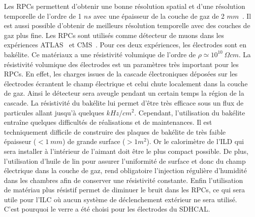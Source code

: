 Les RPCs permettent d'obtenir une bonne résolution spatial et d'une résolution temporelle de l'ordre de 1 $ns$ avec une épaisseur de la couche de gaz de 2 $mm$~\cite{riegler}. Il est aussi possible d'obtenir de meilleurs résolution temporelle avec des couches de gaz plus fine. Les RPCs sont utilisés comme détecteur de muons dans les expériences ATLAS~\cite{atlas} et CMS~\cite{cms}. Pour ces deux expériences, les électrodes sont en bakélite. Ce matériaux a une résistivité volumique de l'ordre de $\rho\simeq10^{10}~\Omega cm$. La résistivité volumique des électrodes est un paramètres très important pour les RPCs. En effet, les charges issues de la cascade électroniques déposées sur les électrodes écrantent le champ électrique et celui chute localement dans la couche de gaz. Ainsi le détecteur sera aveugle pendant un certain temps la région de la cascade. La résistivité du bakélite lui permet d'être très efficace sous un flux de particules allant jusqu'à quelques $kHz/cm^2$. Cependant, l'utilisation du bakélite entraîne quelques difficultés de réalisations et de maintenances. Il est techniquement difficile de construire des plaques de bakélite de très faible épaisseur ($<1~mm$) de grande surface ($>1m^2$). Or le calorimètre de l'ILD qui sera installer à l'intérieur de l'aimant doit être le plus compact possible. De plus, l'utilisation d'huile de lin pour assurer l'uniformité de surface et donc du champ électrique dans la couche de gaz, rend obligatoire l'injection régulière d'humidité dans les chambres afin de conserver une résistivité constante. Enfin l'utilisation de matériau plus résistif permet de diminuer le bruit dans les RPCs, ce qui sera utile pour l'ILC où aucun système de déclenchement extérieur ne sera utilisé. C'est pourquoi le verre a été choisi pour les électrodes du SDHCAL.

